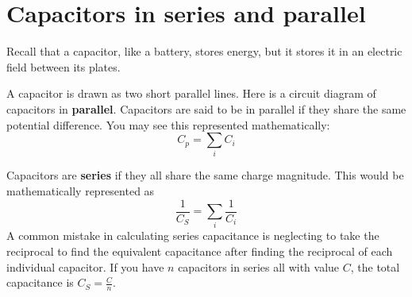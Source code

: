 \section{Capacitors in series and parallel}
Recall that a capacitor, like a battery, stores energy, but it stores it in an electric field between its plates.
\begin{figure}
\end{figure}
A capacitor is drawn as two short parallel lines. Here is a circuit diagram of capacitors in \textbf{parallel}.
Capacitors are said to be in parallel if they share the same potential difference. You may see this represented mathematically:
\begin{equation}
  C_p = \sum_{i}C_i
  \label{eq:capacitor_parallel}
\end{equation}

\begin{figure}
\end{figure}
Capacitors are \textbf{series} if they all share the same charge magnitude. 
This would be mathematically represented as 
\begin{equation}
  \frac{1}{C_S} = \sum_{i}\frac{1}{C_i}
  \label{eq:capacitor_series}
\end{equation}
A common mistake in calculating series capacitance is neglecting to take the reciprocal to find the equivalent capacitance after finding the reciprocal of each individual capacitor. If you have $n$ capacitors in series all with value $C$, the total capacitance is $C_{S} = \frac{C}{n}$.


